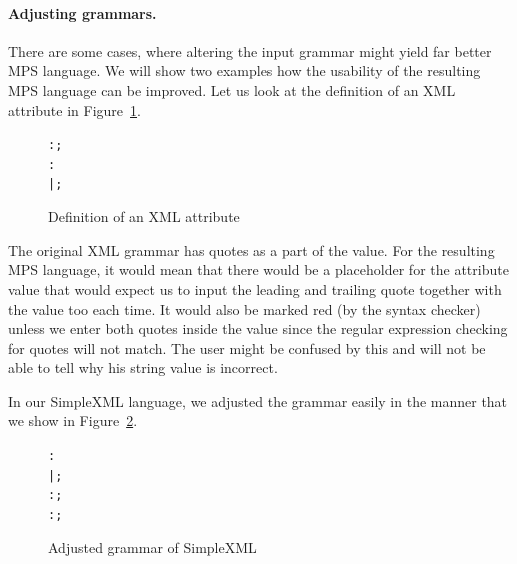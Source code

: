 \paragraph{Adjusting grammars.}
There are some cases, where altering the input grammar might yield far better MPS language.
We will show two examples how the usability of the resulting MPS language can be improved.
Let us look at the definition of an XML attribute in Figure~\ref{fig:xmlattribute}.

\begin{figure}[ht]
\centering
\begin{framed}
\begin{alltt}
	 :  \antlrliteral{=}  ;
	 :  \antlrregex{~["]*} 
	       |  \antlrregex{~[']*}  ;
\end{alltt}
\end{framed}
\caption{Definition of an XML attribute}
\label{fig:xmlattribute}
\end{figure}

The original XML grammar has quotes as a part of the value.
For the resulting MPS language, it would mean that there would be a placeholder for the attribute value that would expect us to input the leading and trailing quote together with the value too each time.
It would also be marked red (by the syntax checker) unless we enter both quotes inside the value since the regular expression checking for quotes will not match.
The user might be confused by this and will not be able to tell why his string value is incorrect.

In our SimpleXML language, we adjusted the grammar easily in the manner that we show in Figure~\ref{fig:xmladjustgrammar}.

\begin{figure}[ht]
\centering
\begin{framed}
\begin{alltt}
	 :    
	       |     ;
	 : \antlrregex{~["]*} ;
	 : \antlrregex{~[']*} ;
\end{alltt}
\end{framed}
\caption{Adjusted grammar of SimpleXML}
\label{fig:xmladjustgrammar}
\end{figure}

